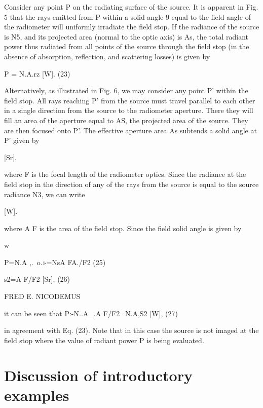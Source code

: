 Consider any point P on the radiating surface
of the source. It is apparent in Fig. 5 that the
rays emitted from P within a solid angle 9 equal
to the field angle of the radiometer will uniformly
irradiate the field stop. If the radiance of the
source is N5, and its projected area (normal to
the optic axis) is As, the total radiant power thus
radiated from all points of the source through the
field stop (in the absence of absorption, reflection,
and scattering losses) is given by

P = N.A.rz [W]. (23)

Alternatively, as illustrated in Fig. 6, we may
consider any point P’ within the field stop. All
rays reaching P’ from the source must travel
parallel to each other in a single direction from
the source to the radiometer aperture. There they
will fill an area of the aperture equal to AS, the
projected area of the source. They are then
focused onto P’. The effective aperture area As
subtends a solid angle at P’ given by

[Sr].

where F is the focal length of the radiometer
optics. Since the radiance at the field stop in the
direction of any of the rays from the source is
equal to the source radiance N3, we can write

[W].

where A F is the area of the field stop. Since the
field solid angle is given by

w%

P=N.A ,.~o.»=NsA FA./F2 (25)

s2=A F/F2 [Sr], (26)

FRED E. NICODEMUS

it can be seen that
P:-N..A_.A F/F2=N.A,S2 [W], (27)

in agreement with Eq. (23). Note that in this
case the source is not imaged at the field stop
where the value of radiant power P is being
evaluated.
\fi

\section{Discussion of introductory examples}

